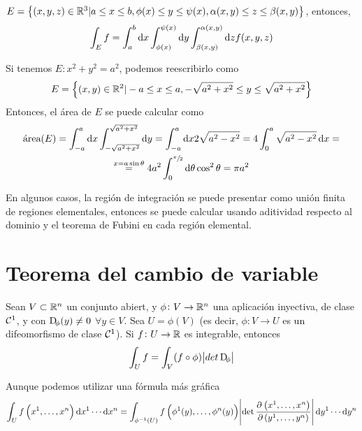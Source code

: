 \begin{example*}
    $E = \left\{(x, y, z) \in \mathbb{R}^3 \vert a \leq x \leq b, \phi(x) \leq y \leq \psi(x), \alpha(x, y) \leq z \leq \beta(x,y)\right\}$,
    entonces,
    \[
        \int_E f = \int^b_a \dif x \int^{\psi(x)}_{\phi(x)} \dif y \int^{\alpha(x,y)}_{\beta\left( x, y \right)} \dif z f(x, y, z)
    \]
\end{example*}

\begin{example*}
    Si tenemos $E: x^2 + y^2 = a^2$, podemos reescribirlo como
    \[
        E = \left\{(x,y) \in \mathbb{R}^2 \vert -a \leq x \leq a, -\sqrt{a^2 + x^2} \leq y \leq \sqrt{a^2 + x^2}\right\}
    \]
    Entonces, el área de $E$ se puede calcular como
    \begin{gather*}
        \text{área}(E) = \int^a_{-a} \dif x \int^{\sqrt{a^2 + x^2}}_{-\sqrt{a^2 + x^2}} \dif y =
        \int^a_{-a} \dif x 2 \sqrt{a^2 - x^2} = 4 \int^a_0 \sqrt{a^2 - x^2} \dif x = \\
        \stackrel{x = a\sin\theta}{=} 4 a^2 \int^{\sfrac{\pi}{2}}_0 \dif \theta \cos^2 \theta = \pi a^2
    \end{gather*}
\end{example*}

\begin{obs}
    En algunos casos, la región de integración se puede presentar como unión finita de regiones elementales, entonces se puede
    calcular usando aditividad respecto al dominio y el teorema de Fubini en cada región elemental.
\end{obs}

\section{Teorema del cambio de variable}

\begin{teo}\label{teo:cambio_variable}
    Sean $V \subset \mathbb{R}^n$ un conjunto abiert, y $\phi \colon V \to \mathbb{R}^n$ una aplicación inyectiva, de clase $\mathcal{C}^1$, y 
    con $\Dif_\phi(y) \neq 0$ $\forall y \in V$. Sea $U = \phi(V)$ (es decir, $\phi \colon V \to U$ es un difeomorfismo de clase
    $\mathcal{C}^1$). Si $f \colon U \to \mathbb{R}$ es integrable, entonces
    \[
        \int_U f = \int_V (f \circ \phi) \abs{det \Dif_\phi}
    \]

    Aunque podemos utilizar una fórmula más gráfica
    \[
        \int_U f \left( x^1, \dots, x^n \right) \dif x^1 \cdots \dif x^n =
        \int_{\inv{\phi}(U)} f\left( \phi^1(y), \dots, \phi^n(y) \right) \abs{\det\pdv{\left(x^1,\dots,x^n\right)}{\left(y^1,\dots,y^n\right)}}
        \dif y^1 \cdots \dif y^n
    \]
\end{teo}

